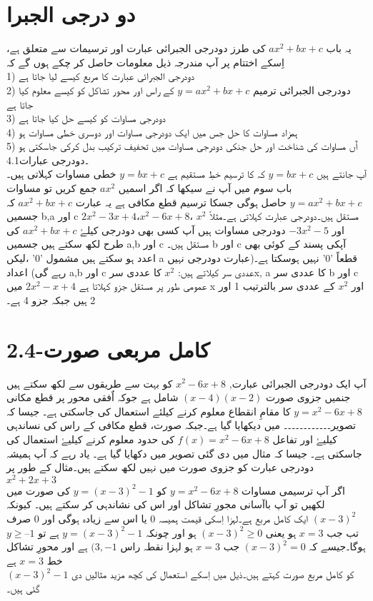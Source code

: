 \section*{دو درجی الجبرا}
 یہ باب \(ax^{2}+bx+c\) کی طرز دودرجی الجبرائی عبارت اور ترسیمات سے متعلق ہے، اِسکے اختتام پر آپ مندرجہ ذیل معلومات حاصل کر چکے ہوں گے کہ\\
 1) دودرجی الجبرائی عبارت کا مربع کیسے لیا جاتا ہے\\
   2) دودرجی الجبرائی ترمیم \(y=ax^{2}+bx+c\) کے راس اور محور تشاکل کو کیسے معلوم کیا جاتا ہے\\
 3) دودرجی مساوات کو کیسے حل کیا جاتا ہے\\
 4) ہمزاد مساوات کا حل جس میں ایک دودرجی مساوات اور  دوسری خطی مساوات ہو\\
 5) اٌں مساوات کی شناخت اور حل جنکی دودرجی مساوات میں تحفیف ترکیب بدل کرکی جاسکتی ہو\\
 4.1۔دودرجی عبارات\\
 آپ جانتے ہیں \(y=bx+c\) کہ کا ترسیم خطِ مستقیم ہے \(y=bx+c\) خطی مساوات کہلاتی ہیں۔باب سوم میں آپ نے سیکھا کہ اگر اسمیں \(ax^{2}\) جمع کریں تو مساوات \(y=ax^{2}+bx+c\) حاصل ہوگی جسکا ترسیم قطع مکافی ہے یہ عبارت  \(ax^{2}+bx+c\) کہ جسمیں b,a اور c مستقل ہیں۔دودرجی عبارت کہلاتی ہے۔مثلاً \(x^{2}\) ،\(x^{2}-6x+8\)،\(2x^{2}-3x+4\)  اور  \(-3x^{2}-5\) دودرجی مساوات ہیں آپ کسی بھی دودرجی کیلۓ \(ax^{2}+bx+c\) کی طرح لکھ سکتے ہیں جسمیں a,b اور c مستقل ہیں۔ b اور c آپکی پسند کے کوئی بھی اعدد ہو سکتے ہیں مشمول '0' ،لیکں a قطعاً '0' نہیں ہوسکتا ہے۔(عبارت دودرجی نہیں رہے گی) اعداد a,b اور c عددی سر کیلاتے ہیں: \(x^{2}\) کا عددی سرx, a  کا عددی سر b اور c عمومی طور پر مستقل جزو کہلاتا ہے \(2x^{2}-x+4\) میں x اور \(x^{2}\) کے عددی سر بالترتیب 1 اور 2 ہیں جبکہ جزو 4 ہے۔\\
\section*{ 2.4-کامل مربعی صورت}
 آپ ایک دودرجی الجبرائی عبارت, \(x^{2}-6x+8\) کو بہت سے طریقوں سے لکھ سکتے ہیں جنمیں جزوی صورت \((x-4)(x-2)\) شامل ہے جوکہ اٌفقی محور پر قطع مکانی \(y=x^{2}-6x+8\) کا مقامِ انقطاع معلوم کرنے کیلئے استعمال کی جاسکتی ہے۔ جیسا کہ تصویر۔۔۔۔۔۔۔۔۔۔۔۔ میں دیکھایا گیا ہے۔جبکہ صورت، قطع مکافی کے راس کی نساندہی کیلیۓ اور تفاعل \(f(x)=x^{2}-6x+8\) کی حدود معلوم کرنے کیلیۓ استعمال کی جاسکتی ہے۔ جیسا کہ مثال میں دی گئی تصویر میں دکھایا گیا ہے۔ یاد رہے کہ آپ ہمیشہ دودرجی عبارت کو جزوی صورت میں نہیں لکھ سکتے ہیں۔مثال کے طور پر \(x^{2}+2x+3\)\\
 \newpage
 اگر آپ ترسیمی مساوات \(y=x^{2}-6x+8\) کو \(y=(x-3)^{2}-1\) کی صورت میں لکھیں تو آپ باآسانی مجورِ تشاکل اور اس کی نشاندہی کر سکتے ہیں۔ کیونکہ \((x-3)^{2}\) ایک کامل مربع ہے۔لہزا اِسکی قیمت ہمیسہ 0 یا اس سے زیادہ ہوگی اور 0 صرف تب جب \(x=3\) ہو یعنی  \((x-3)^{2}\ge 0\)  ہو اور چونکہ \(y=(x-3)^{2}-1\) ہے تو  \(y\ge – 1\) ہوگا۔جیسے کہ \((x-3)^{2}=0\)  جب \(x=3\) ہو لہزا نقطہ راس  \((3,-1\) ہے اور محورِ تشاکل خط  \(x=3\) ہے\\ \((x-3)^{2}-1\) کو کامل مربع صورت کہتے ہیں۔ذیل میں اِسکے استعمال کی کچھ مزید مثالیں دی  گئی ہیں۔\\
